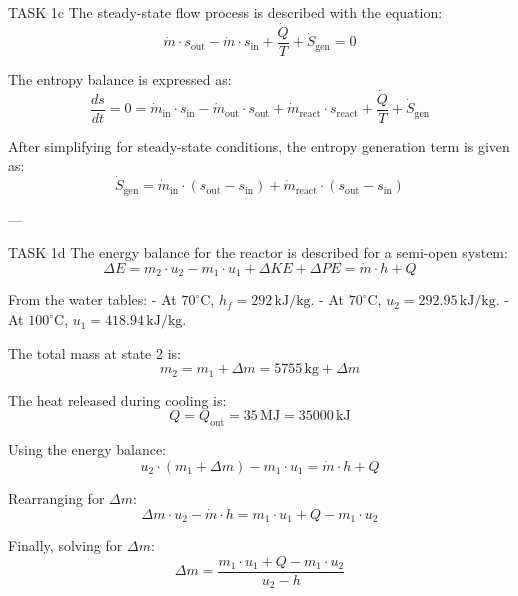TASK 1c  
The steady-state flow process is described with the equation:  
\[
\dot{m} \cdot s_{\text{out}} - \dot{m} \cdot s_{\text{in}} + \frac{\dot{Q}}{T} + \dot{S}_{\text{gen}} = 0
\]  

The entropy balance is expressed as:  
\[
\frac{ds}{dt} = 0 = \dot{m}_{\text{in}} \cdot s_{\text{in}} - \dot{m}_{\text{out}} \cdot s_{\text{out}} + \dot{m}_{\text{react}} \cdot s_{\text{react}} + \frac{\dot{Q}}{T} + \dot{S}_{\text{gen}}
\]  

After simplifying for steady-state conditions, the entropy generation term is given as:  
\[
\dot{S}_{\text{gen}} = \dot{m}_{\text{in}} \cdot (s_{\text{out}} - s_{\text{in}}) + \dot{m}_{\text{react}} \cdot (s_{\text{out}} - s_{\text{in}})
\]  

---

TASK 1d  
The energy balance for the reactor is described for a semi-open system:  
\[
\Delta E = m_2 \cdot u_2 - m_1 \cdot u_1 + \Delta KE + \Delta PE = \dot{m} \cdot h + Q
\]  

From the water tables:  
- At \( 70^\circ\text{C} \), \( h_f = 292 \, \text{kJ/kg} \).  
- At \( 70^\circ\text{C} \), \( u_2 = 292.95 \, \text{kJ/kg} \).  
- At \( 100^\circ\text{C} \), \( u_1 = 418.94 \, \text{kJ/kg} \).  

The total mass at state 2 is:  
\[
m_2 = m_1 + \Delta m = 5755 \, \text{kg} + \Delta m
\]  

The heat released during cooling is:  
\[
Q = Q_{\text{out}} = 35 \, \text{MJ} = 35000 \, \text{kJ}
\]  

Using the energy balance:  
\[
u_2 \cdot (m_1 + \Delta m) - m_1 \cdot u_1 = \dot{m} \cdot h + Q
\]  

Rearranging for \( \Delta m \):  
\[
\Delta m \cdot u_2 - \dot{m} \cdot h = m_1 \cdot u_1 + Q - m_1 \cdot u_2
\]  

Finally, solving for \( \Delta m \):  
\[
\Delta m = \frac{m_1 \cdot u_1 + Q - m_1 \cdot u_2}{u_2 - h}
\]